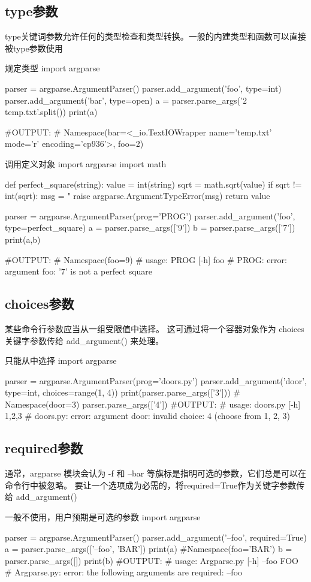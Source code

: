 \documentclass[11pt]{article}
\begin{document}
\subsection{type参数}
type关键词参数允许任何的类型检查和类型转换。一般的内建类型和函数可以直接被type参数使用
\begin{Python}{规定类型}
import argparse

parser = argparse.ArgumentParser()
parser.add_argument('foo', type=int)
parser.add_argument('bar', type=open)
a = parser.parse_args('2 temp.txt'.split())
print(a)

#OUTPUT:
#       Namespace(bar=<_io.TextIOWrapper name='temp.txt' mode='r' encoding='cp936'>, foo=2)
\end{Python}
\begin{Python}{调用定义对象}
import argparse
import math

def perfect_square(string):
value = int(string)
sqrt = math.sqrt(value)
if sqrt != int(sqrt):
msg = "%
raise argparse.ArgumentTypeError(msg)
return value

parser = argparse.ArgumentParser(prog='PROG')
parser.add_argument('foo', type=perfect_square)
a = parser.parse_args(['9'])
b = parser.parse_args(['7'])
print(a,b)

#OUTPUT:
#       Namespace(foo=9)
#       usage: PROG [-h] foo
#       PROG: error: argument foo: '7' is not a perfect square
\end{Python}
\subsection{choices参数}
某些命令行参数应当从一组受限值中选择。 这可通过将一个容器对象作为 choices 关键字参数传给 add\_argument() 来处理。
\begin{Python}{只能从中选择}
import argparse

parser = argparse.ArgumentParser(prog='doors.py')
parser.add_argument('door', type=int, choices=range(1, 4))
print(parser.parse_args(['3']))
# Namespace(door=3)
parser.parse_args(['4'])
#OUTPUT:
#       usage: doors.py [-h] {1,2,3}
#       doors.py: error: argument door: invalid choice: 4 (choose from 1, 2, 3)
\end{Python}
\subsection{required参数}
通常，argparse 模块会认为 -f 和 --bar 等旗标是指明可选的参数，它们总是可以在命令行中被忽略。 要让一个选项成为必需的，将required=True作为关键字参数传给 add\_argument()
\begin{Python}{一般不使用，用户预期是可选的参数}
import argparse

parser = argparse.ArgumentParser()
parser.add_argument('--foo', required=True)
a = parser.parse_args(['--foo', 'BAR'])
print(a)
#Namespace(foo='BAR')
b = parser.parse_args([])
print(b)
#OUTPUT:
#       usage: Argparse.py [-h] --foo FOO
#       Argparse.py: error: the following arguments are required: --foo
\end{Python}
\end{document}
